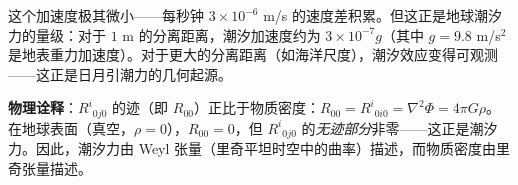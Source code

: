 这个加速度极其微小——每秒钟 $3 \times 10^{-6}$ m/s 的速度差积累。但这正是地球潮汐力的量级：对于 $1$ m 的分离距离，潮汐加速度约为 $3 \times 10^{-7} g$（其中 $g = 9.8$ m/s$^2$ 是地表重力加速度）。对于更大的分离距离（如海洋尺度），潮汐效应变得可观测——这正是日月引潮力的几何起源。

\textbf{物理诠释}：$R^i{}_{0j0}$ 的迹（即 $R_{00}$）正比于物质密度：$R_{00} = R^i{}_{0i0} = \nabla^2\Phi = 4\pi G\rho$。在地球表面（真空，$\rho=0$），$R_{00}=0$，但 $R^i{}_{0j0}$ 的\emph{无迹部分}非零——这正是潮汐力。因此，潮汐力由 Weyl 张量（里奇平坦时空中的曲率）描述，而物质密度由里奇张量描述。

